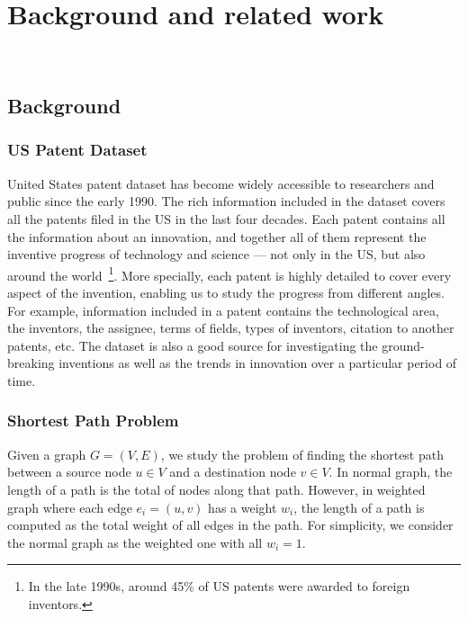 \section{Background and related work}
\
\subsection{Background}

\subsubsection{US Patent Dataset}%
United States patent dataset has become widely
accessible to researchers and public since the early 1990. The rich
information included in the dataset covers all the patents filed in the US
in the last four decades. Each patent contains all the information about an
innovation, and together all of them represent the inventive progress of
technology and science --- not only in the US, but also around the
world~\footnote{In the late 1990s, around 45\% of US patents were awarded to
foreign inventors.}. More specially, each patent is highly detailed to cover
every aspect of the invention, enabling us to study the progress from
different angles. For example, information included in a patent contains  the
technological area, the inventors, the assignee,  terms of fields, types of
inventors, citation to another patents, etc. The dataset is also a good
source  for investigating the ground-breaking inventions as well as the trends in 
innovation over a particular period of time.



 
\subsubsection{Shortest Path Problem} 
%
Given a graph $G = (V, E)$, we study the problem of finding the shortest path
between a source node $u \in V$ and a destination node $v \in V$. In normal
graph, the length of a path is the total of nodes along that path. However, in
weighted graph where each edge $e_i = (u, v)$ has a weight $w_i$, the length
of a path is computed as the total weight of all edges in the path. For
simplicity, we consider the normal graph as the weighted one with all $w_i=1$.

